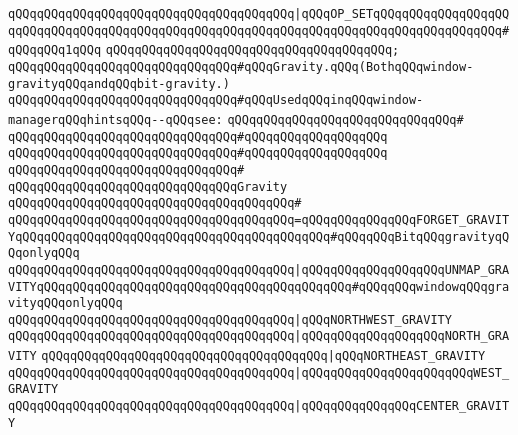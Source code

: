 \verb|qQQqqQQqqQQqqQQqqQQqqQQqqQQqqQQqqQQqqQQq|\verb#|qQQqOP_SETqQQqqQQqqQQqqQQqqQQqqQQqqQQqqQQqqQQqqQQqqQQqqQQqqQQqqQQqqQQqqQQqqQQqqQQqqQQqqQQqqQQqqQQq#\verb|#qQQqqQQq1qQQq|\newline
\verb|qQQqqQQqqQQqqQQqqQQqqQQqqQQqqQQqqQQqqQQq;|\newline
\newline
\newline
\verb|qQQqqQQqqQQqqQQqqQQqqQQqqQQqqQQq#qQQqGravity.qQQq(BothqQQqwindow-gravityqQQqandqQQqbit-gravity.)|\newline
\verb|qQQqqQQqqQQqqQQqqQQqqQQqqQQqqQQq#qQQqUsedqQQqinqQQqwindow-managerqQQqhintsqQQq--qQQqsee:|\newline
\verb|qQQqqQQqqQQqqQQqqQQqqQQqqQQqqQQq#|\newline
\verb|qQQqqQQqqQQqqQQqqQQqqQQqqQQqqQQq#qQQqqQQqqQQqqQQqqQQq|\newline
\verb|qQQqqQQqqQQqqQQqqQQqqQQqqQQqqQQq#qQQqqQQqqQQqqQQqqQQq|\newline
\verb|qQQqqQQqqQQqqQQqqQQqqQQqqQQqqQQq#|\newline
\verb|qQQqqQQqqQQqqQQqqQQqqQQqqQQqqQQqGravity|\newline
\verb|qQQqqQQqqQQqqQQqqQQqqQQqqQQqqQQqqQQqqQQq#|\newline
\verb|qQQqqQQqqQQqqQQqqQQqqQQqqQQqqQQqqQQqqQQq=qQQqqQQqqQQqqQQqFORGET_GRAVITYqQQqqQQqqQQqqQQqqQQqqQQqqQQqqQQqqQQqqQQqqQQq#qQQqqQQqBitqQQqgravityqQQqonlyqQQq|\newline
\verb|qQQqqQQqqQQqqQQqqQQqqQQqqQQqqQQqqQQqqQQq|\verb#|qQQqqQQqqQQqqQQqqQQqUNMAP_GRAVITYqQQqqQQqqQQqqQQqqQQqqQQqqQQqqQQqqQQqqQQqqQQq#\verb|#qQQqqQQqwindowqQQqgravityqQQqonlyqQQq|\newline
\verb|qQQqqQQqqQQqqQQqqQQqqQQqqQQqqQQqqQQqqQQq|\verb#|qQQqNORTHWEST_GRAVITY#\newline
\verb|qQQqqQQqqQQqqQQqqQQqqQQqqQQqqQQqqQQqqQQq|\verb#|qQQqqQQqqQQqqQQqqQQqNORTH_GRAVITY#\newline
\verb|qQQqqQQqqQQqqQQqqQQqqQQqqQQqqQQqqQQqqQQq|\verb#|qQQqNORTHEAST_GRAVITY#\newline
\verb|qQQqqQQqqQQqqQQqqQQqqQQqqQQqqQQqqQQqqQQq|\verb#|qQQqqQQqqQQqqQQqqQQqqQQqWEST_GRAVITY#\newline
\verb|qQQqqQQqqQQqqQQqqQQqqQQqqQQqqQQqqQQqqQQq|\verb#|qQQqqQQqqQQqqQQqCENTER_GRAVITY#\newline
